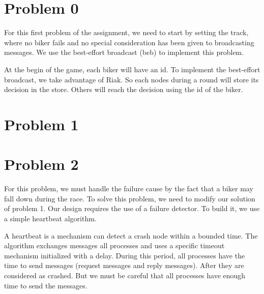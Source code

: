 \documentclass{article}
\begin{document}
\section*{Problem 0}
For this first problem of the assignment, we need to start by setting the track, where no biker fails and no special
consideration has been given to broadcasting messages. We use the best-effort broadcast (beb) to implement 
this problem.


At the begin of the game, each biker will have an id.  To implement the best-effort broadcast, we take advantage of
Riak. So each nodes during a round will store its decision in the store. Others will reach the decision using the id of 
the biker.


\section*{Problem 1}

\section*{Problem 2}
For this problem, we must handle the failure cause by the fact that a biker may fall down during the race.
To solve this problem, we need to modify our solution of problem 1. Our design requires the use of a 
failure detector. To build it, we use a simple heartbeat algorithm.

A heartbeat is a mechanism can detect a crash node within a bounded time. The algorithm exchanges 
messages all processes and uses a specific timeout mechanism initialized with a delay. During this period,
all processes have the time to send messages (request messages and reply messages). After they are considered 
as crashed. But we must be careful that all processes have enough time to send the messages. 
\end{document}
